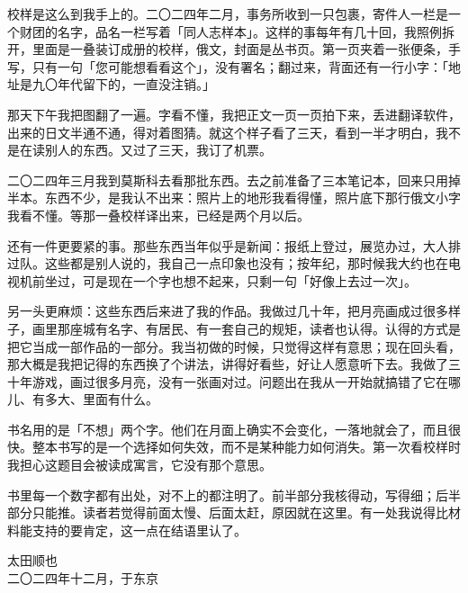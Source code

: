 校样是这么到我手上的。二〇二四年二月，事务所收到一只包裹，寄件人一栏是一个财团的名字，品名一栏写着「同人志样本」。这样的事每年有几十回，我照例拆开，里面是一叠装订成册的校样，俄文，封面是丛书页。第一页夹着一张便条，手写，只有一句「您可能想看看这个」，没有署名；翻过来，背面还有一行小字：「地址是九〇年代留下的，一直没注销。」

那天下午我把图翻了一遍。字看不懂，我把正文一页一页拍下来，丢进翻译软件，出来的日文半通不通，得对着图猜。就这个样子看了三天，看到一半才明白，我不是在读别人的东西。又过了三天，我订了机票。

二〇二四年三月我到莫斯科去看那批东西。去之前准备了三本笔记本，回来只用掉半本。东西不少，是我认不出来：照片上的地形我看得懂，照片底下那行俄文小字我看不懂。等那一叠校样译出来，已经是两个月以后。

还有一件更要紧的事。那些东西当年似乎是新闻：报纸上登过，展览办过，大人排过队。这些都是别人说的，我自己一点印象也没有；按年纪，那时候我大约也在电视机前坐过，可是现在一个字也想不起来，只剩一句「好像上去过一次」。

另一头更麻烦：这些东西后来进了我的作品。我做过几十年，把月亮画成过很多样子，画里那座城有名字、有居民、有一套自己的规矩，读者也认得。认得的方式是把它当成一部作品的一部分。我当初做的时候，只觉得这样有意思；现在回头看，那大概是我把记得的东西换了个讲法，讲得好看些，好让人愿意听下去。我做了三十年游戏，画过很多月亮，没有一张画对过。问题出在我从一开始就搞错了它在哪儿、有多大、里面有什么。

书名用的是「不想」两个字。他们在月面上确实不会变化，一落地就会了，而且很快。整本书写的是一个选择如何失效，而不是某种能力如何消失。第一次看校样时我担心这题目会被读成寓言，它没有那个意思。

书里每一个数字都有出处，对不上的都注明了。前半部分我核得动，写得细；后半部分只能推。读者若觉得前面太慢、后面太赶，原因就在这里。有一处我说得比材料能支持的要肯定，这一点在结语里认了。

\begin{flushright}
{\small 太田顺也}\\[2mm]
{\footnotesize\color{pencil} 二〇二四年十二月，于东京}
\end{flushright}

\clearpage
